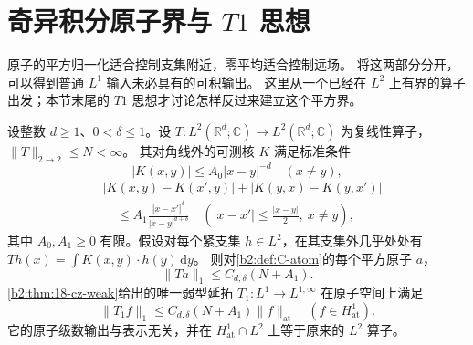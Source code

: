 \section{奇异积分原子界与 \texorpdfstring{\(T1\)}{T1} 思想}
\label{b2:sec:app-C-4}

原子的平方归一化适合控制支集附近，零平均适合控制远场。
将这两部分分开，可以得到普通 \(L^1\) 输入未必具有的可积输出。
这里从一个已经在 \(L^2\) 上有界的算子出发；本节末尾的
\(T1\) 思想才讨论怎样反过来建立这个平方界。

\begin{proposition}[奇异积分的原子界]
\label{b2:prop:C-atom-cz}
设整数 \(d\ge1\)、\(0<\delta\le1\)。设
\(T:L^2(\mathbb R^d;\mathbb C)\to L^2(\mathbb R^d;\mathbb C)\)
为复线性算子，\(\|T\|_{2\to2}\le N<\infty\)。
其对角线外的可测核 \(K\) 满足标准条件
\[
 |K(x,y)|\le A_0|x-y|^{-d}\quad(x\ne y),
\]
\[
\begin{aligned}
 &|K(x,y)-K(x',y)|+|K(y,x)-K(y,x')|\\
 &\quad\le A_1\frac{|x-x'|^\delta}{|x-y|^{d+\delta}}
 \quad\left(|x-x'|\le\frac{|x-y|}{2},\ x\ne y\right),
\end{aligned}
\]
其中 \(A_0,A_1\ge0\) 有限。假设对每个紧支集
\(h\in L^2\)，在其支集外几乎处处有
\(Th(x)=\int K(x,y)\cdot h(y)\,\mathrm dy\)。
则对\cref{b2:def:C-atom}的每个平方原子 \(a\)，
\[
 \|Ta\|_1\le C_{d,\delta}(N+A_1).
\]
\cref{b2:thm:18-cz-weak}给出的唯一弱型延拓
\(T_1:L^1\to L^{1,\infty}\) 在原子空间上满足
\[
 \|T_1f\|_1\le C_{d,\delta}(N+A_1)\|f\|_{\mathrm{at}}
 \quad(f\in H^1_{\mathrm{at}}).
\]
它的原子级数输出与表示无关，并在
\(H^1_{\mathrm{at}}\cap L^2\) 上等于原来的 \(L^2\) 算子。
\end{proposition}

